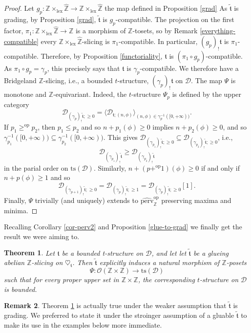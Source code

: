\documentclass{article}
\newtheorem{thm}{Theorem}[section]
\theoremstyle{definition}
\newtheorem{rem}[thm]{Remark}
\newcommand{\Z}{\mathbb{Z}}
\newcommand{\Oo}{\mathcal{O}}
\newcommand{\ts}{\mathrm{ts}}
\newcommand{\tee}{\mathfrak{t}}
\begin{document}
\begin{proof}
Let $g_p\colon \mathbb{Z} \times_{\mathrm{lex}} \hat{\mathbb{Z}}\to \mathbb{Z} \times_{\mathrm{lex}} \hat{\mathbb{Z}}$ the map defined in Proposition \ref{grad}
As $\tilde{\tee}$ is grading, by Proposition \ref{grad}, $\tilde{\tee}$ is $g_p$-compatible. The projection on the first factor, $\pi_1\colon  \mathbb{Z} \times_{\mathrm{lex}} \hat{\mathbb{Z}}\to \Z$ is a morphism of $\Z$-tosets, so by Remark \ref{everything-compatible} every $\mathbb{Z} \times_{\mathrm{lex}} \hat{\mathbb{Z}}$-slicing is $\pi_1$-compatible. In particular, $(g_p)_!\tee$ is $\pi_1$-compatible. Therefore, by Proposition \ref{functoriality}, $\tee$ is $(\pi_1\circ g_p)$-compatible. As $\pi_1\circ g_p=\gamma_p$, this precisely says that $\tee$ is $\gamma_p$-compatible. We therefore have a Bridgeland $\Z$-slicing, i.e., a bounded $t$-structure, $(\gamma_p)_!\tee$ on $\mathscr{D}$. The map $\Psi$ is monotone and $\Z$-equivariant. Indeed, the $t$-structure $\Psi_p$ is defined by the upper category
\[
\mathscr{D}_{(\gamma_{p})_!\tilde{\tee};\geq 0}=\langle \mathscr{D}_{\tee;(n,\phi)}\rangle_{(n,\phi)\in \gamma_p^{-1}([0,+\infty))}.
\]
If $p_1\geq^{\mathrm{op}} p_2$, then  $p_1\leq p_2$ and so $n+p_1(\phi)\geq 0$ implies $n+p_2(\phi)\geq 0$, and so $\gamma_{p_1}^{-1}([0,+\infty))\subseteq \gamma_{p_2}^{-1}([0,+\infty))$. This gives $\mathscr{D}_{(\gamma_{p_1})_!\tilde{\tee};\geq 0}\subseteq \mathscr{D}_{(\gamma_{p_2})_!\tilde{\tee};\geq 0}$, i.e.,
\[
\mathscr{D}_{(\gamma_{p_1})_!\tilde{\tee}}\geq \mathscr{D}_{(\gamma_{p_2})_!\tilde{\tee}}
\]
in the parial order on  $\ts(\mathscr{D})$. Similarly, $n+(p+^{\mathrm{op}}1)(\phi)\geq 0$ if and only if $n+p(\phi)\geq 1$ and so
\[
\mathscr{D}_{(\gamma_{p+1})_!\tilde{\tee};\geq 0}=\mathscr{D}_{(\gamma_{p})_!\tilde{\tee};\geq 1}=\mathscr{D}_{(\gamma_{p})_!\tilde{\tee};\geq 0}[1].
\]
Finally, $\Psi$ trivially (and uniquely) extends to $\widehat{\mathrm{perv}}_\Z^{\mathrm{op}}$ preserving maxima and minima.
\end{proof}
Recalling Corollary \ref{cor-perv2} and Proposition \ref{glue-to-grad} we finally get the result we were aiming to.
\begin{thm}\label{main-thm}
Let $\mathfrak{t}$ be a bounded t-structure on $\mathscr{D}$, and let let $\tilde{\tee}$ be a glueing abelian $\mathbb{Z}$-slicing on $\heartsuit_{\mathfrak{t}}$. Then $\tilde{\tee}$ explicitly induces a natural morphism of $\Z$-posets
\[
\Psi\colon\Oo(\Z\times\Z)\to \ts(\mathscr{D})
\]
such that for every proper upper set in $\Z\times \Z$, the corresponding $t$-structure on $\mathscr{D}$ is bounded. 
\end{thm}
\begin{rem}
Theorem \ref{main-thm} is actually true under the weaker assumption that $\tilde{\tee}$ is grading. We preferred to state it under the stroinger assumption of a gluable $\tilde{\tee}$ to make its use in the examples below more immediate.
\end{rem}
\end{document}

